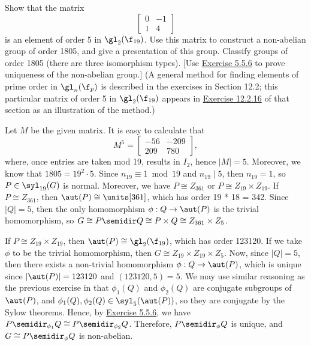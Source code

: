 \begin{exercise}\label{ex5.5.9}
    Show that the matrix
    \[
    \begin{bmatrix}
        0 & -1 \\
        1 & 4
    \end{bmatrix}\]
    is an element of order 5 in $\gl_2(\f_{19})$. Use this matrix to construct a non-abelian group of order 1805, and give a presentation of this group. Classify groups of order 1805 (there are three isomorphism types). [Use \hyperref[ex5.5.6]{Exercise 5.5.6} to prove uniqueness of the non-abelian group.] (A general method for finding elements of prime order in $\gl_n(\f_p)$ is described in the exercises in Section 12.2; this particular matrix of order 5 in $\gl_2(\f_{19})$ appears in \hyperref[ex12.2.16]{Exercise 12.2.16} of that section as an illustration of the method.)
\end{exercise}

\begin{sol}
    Let $M$ be the given matrix. It is easy to calculate that
    \[M^5 = 
    \begin{bmatrix}
       -56 & -209 \\
       209 & 780
    \end{bmatrix},\]
    where, once entries are taken mod 19, results in $I_2$, hence $|M| = 5$. Moreover, we know that $1805 = 19^2 \cdot 5$. Since $n_{19} \equiv 1 \bmod 19$ and $n_{19} \mid 5$, then $n_{19} = 1$, so $P \in \syl_{19}(G)$ is normal. Moreover, we have $P \cong Z_{361}$ or $P \cong Z_{19} \times Z_{19}$. If $P \cong Z_{361}$, then $\aut(P) \cong \units[361]$, which has order 19 * 18 = 342. Since $|Q| = 5$, then the only homomorphism $\phi : Q \to \aut(P)$ is the trivial homomorphism, so $G \cong P \semidir Q \cong P \times Q \cong Z_{361} \times Z_5$.

    If $P \cong Z_{19} \times Z_{19}$, then $\aut(P) \cong \gl_2(\f_{19})$, which has order 123120. If we take $\phi$ to be the trivial homomorphism, then $G \cong Z_{19} \times Z_{19} \times Z_5$. Now, since $|Q| = 5$, then there exists a non-trivial homomorphism $\phi : Q \to \aut(P)$, which is unique since $|\aut(P)| = 123120$ and $(123120, 5) = 5$. We may use similar reasoning as the previous exercise in that $\phi_1(Q)$ and $\phi_2(Q)$ are conjugate subgroups of $\aut(P)$, and $\phi_1(Q), \phi_2(Q) \in \syl_5(\aut(P))$, so they are conjugate by the Sylow theorems. Hence, by \hyperref[ex5.5.6]{Exercise 5.5.6}, we have $P \semidir_{\phi_1} Q \cong P \semidir_{\phi_2} Q$. Therefore, $P \semidir_\phi Q$ is unique, and $G \cong P \semidir_\phi Q$ is non-abelian.
\end{sol}

